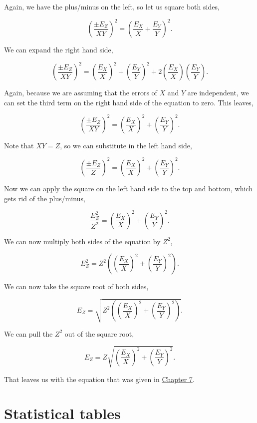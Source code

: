 \documentclass[
]{scrbook}
\begin{document}
Again, we have the plus/minus on the left, so let us square both sides,

\[\left(\frac{\pm E_Z}{XY}\right)^2 = \left(\frac{E_X}{X} +\frac{E_Y}{Y}\right)^2.\]

We can expand the right hand side,

\[\left(\frac{\pm E_Z}{XY}\right)^2 = \left(\frac{E_X}{X}\right)^2 +\left(\frac{E_Y}{Y}\right)^2 + 2\left(\frac{E_X}{X}\right)\left(\frac{E_Y}{Y}\right).\]

Again, because we are assuming that the errors of \(X\) and \(Y\) are independent, we can set the third term on the right hand side of the equation to zero.
This leaves,

\[\left(\frac{\pm E_Z}{XY}\right)^2 = \left(\frac{E_X}{X}\right)^2 +\left(\frac{E_Y}{Y}\right)^2.\]

Note that \(XY = Z\), so we can substitute in the left hand side,

\[\left(\frac{\pm E_Z}{Z}\right)^2 = \left(\frac{E_X}{X}\right)^2 +\left(\frac{E_Y}{Y}\right)^2.\]

Now we can apply the square on the left hand side to the top and bottom, which gets rid of the plus/minus,

\[\frac{E_Z^2}{Z^2} = \left(\frac{E_X}{X}\right)^2 +\left(\frac{E_Y}{Y}\right)^2.\]

We can now multiply both sides of the equation by \(Z^2\),

\[E_Z^2 = Z^2 \left(\left(\frac{E_X}{X}\right)^2 +\left(\frac{E_Y}{Y}\right)^2 \right).\]

We can now take the square root of both sides,

\[E_Z = \sqrt{ Z^2 \left( \left( \frac{E_X}{X}\right)^2 + \left(\frac{E_Y}{Y}\right)^2 \right) }.\]

We can pull the \(Z^2\) out of the square root,

\[E_Z = Z \sqrt{\left( \frac{E_X}{X}\right)^2 + \left(\frac{E_Y}{Y}\right)^2}.\]

That leaves us with the equation that was given in \protect\hyperlink{Chapter_7}{Chapter 7}.

\hypertarget{appendixC_tables}{%
\chapter{Statistical tables}\label{appendixC_tables}}

  
\end{document}
